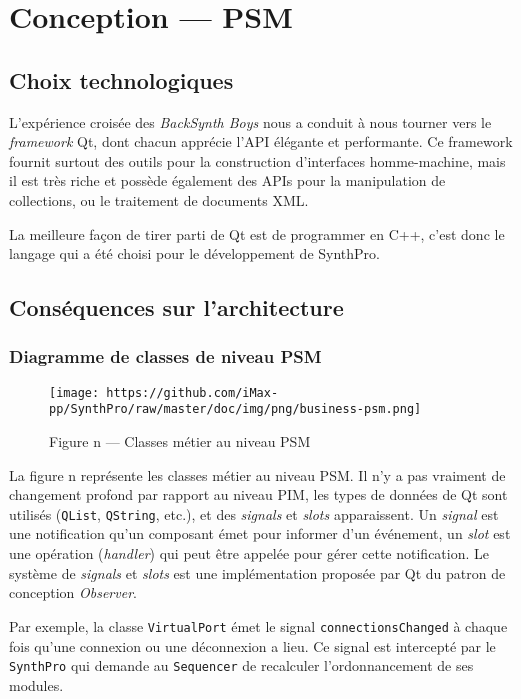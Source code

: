 \section{Conception — PSM}

\subsection{Choix technologiques}

L'expérience croisée des \emph{BackSynth Boys} nous a conduit à
nous tourner vers le \emph{framework} Qt, dont chacun apprécie
l'API élégante et performante. Ce framework fournit surtout des
outils pour la construction d'interfaces homme-machine, mais il est
très riche et possède également des APIs pour la manipulation de
collections, ou le traitement de documents XML.

La meilleure façon de tirer parti de Qt est de programmer en C++,
c'est donc le langage qui a été choisi pour le développement de
SynthPro.

\subsection{Conséquences sur l'architecture}

\subsubsection{Diagramme de classes de niveau PSM}

\begin{figure}[htb]
\centering
\texttt{[image: https://github.com/iMax-pp/SynthPro/raw/master/doc/img/png/business-psm.png]}
\caption{Figure n — Classes métier au niveau PSM}
\end{figure}

La figure n représente les classes métier au niveau PSM. Il n'y a
pas vraiment de changement profond par rapport au niveau PIM, les
types de données de Qt sont utilisés (\verb!QList!, \verb!QString!,
etc.), et des \emph{signals} et \emph{slots} apparaissent. Un
\emph{signal} est une notification qu'un composant émet pour
informer d'un événement, un \emph{slot} est une opération
(\emph{handler}) qui peut être appelée pour gérer cette
notification. Le système de \emph{signals} et \emph{slots} est une
implémentation proposée par Qt du patron de conception
\emph{Observer}.

Par exemple, la classe \verb!VirtualPort! émet le signal
\verb!connectionsChanged! à chaque fois qu'une connexion ou une
déconnexion a lieu. Ce signal est intercepté par le \verb!SynthPro!
qui demande au \verb!Sequencer! de recalculer l'ordonnancement de
ses modules.

